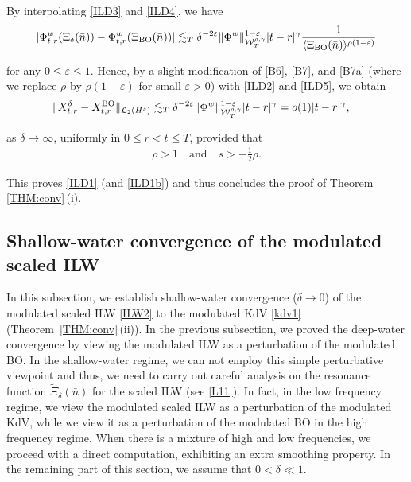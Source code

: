 \documentclass[letterpaper, 11pt,  reqno]{amsart}
\newcommand{\1}{\hspace{0.5mm}\text{I}\hspace{0.5mm}}
\newcommand{\noi}{\noindent}
\newcommand{\dl}{\delta}
\newcommand{\eps}{\varepsilon}
\newcommand{\g}{\gamma}
\newcommand{\wt}{\widetilde}
\newcommand{\les}{\lesssim}
\newcommand{\jb}[1]
{\langle #1 \rangle}
\newcommand{\cL}{\mathcal{L}}
\newcommand{\W}{\mathcal{W}}
\newcommand{\BO}{\text{\rm BO} }
\numberwithin{equation}{section}
\numberwithin{theorem}{section}
\begin{document}
\noi
By interpolating \eqref{ILD3} and \eqref{ILD4}, 
we have 
\begin{align}
|\Phi_{t,r}^w(\Xi_\dl (\bar n)) - \Phi_{t,r}^w(\Xi_\BO(\bar n) )|
\les_T \dl^{-2\eps} \|\Phi^w\|_{  \W^{\rho,\g}_T}^{1-\eps} 
|t - r|^\g
\frac 1{\jb{\Xi_\BO (\bar n)}^{\rho(1-\eps)}}
\label{ILD5}
\end{align}

\noi
for any $0 \le \eps \le 1$.
Hence, 
by a slight modification of \eqref{B6}, \eqref{B7}, and \eqref{B7a}
(where we replace $\rho$ by $\rho (1-\eps)$ for small $\eps > 0$)
with \eqref{ILD2} and \eqref{ILD5}, 
we obtain 
\begin{align*}
\| X_{t, r}^\dl - X^\BO_{t,r} \|_{\cL_2 (H^s)}
&\les_T \dl^{-2\eps}  
\|\Phi^w\|_{  \W^{\rho,\g}_T}^{1-\eps} 
|t - r|^\g
= o(1) |t - r|^\g, 
\end{align*}

\noi
as $\dl \to \infty$, 
uniformly in  $0 \le r < t \le T$, 
provided that 
\begin{align*}
\rho > 1\quad \text{and}\quad
s > - \frac 12 \rho.
\end{align*}

\noi
This proves \eqref{ILD1} (and \eqref{ILD1b})
and thus concludes the proof of Theorem \ref{THM:conv}\,(i).






\subsection{Shallow-water convergence of  the modulated scaled ILW}
\label{SUBSEC:BO4}



In this subsection,
we establish shallow-water 
convergence ($\dl \to 0$) of the modulated scaled ILW
\eqref{ILW2} to the modulated KdV \eqref{kdv1} 
(Theorem~\ref{THM:conv}\,(ii)).
In the previous subsection, 
we proved the deep-water convergence
 by viewing the modulated ILW
as a perturbation of the modulated BO.
In the shallow-water regime, 
we can not employ this simple perturbative viewpoint
and thus, we need to carry out careful analysis
on the resonance function $\wt \Xi_\dl(\bar n)$ 
for the scaled ILW (see  \eqref{L11}).
In fact, in the low frequency regime, 
we view the modulated scaled ILW
as a perturbation of the modulated KdV, 
while 
we view it 
as a perturbation of the modulated BO
in the high frequency regime.
When there is a mixture of high and low frequencies, 
we proceed with a direct computation, 
exhibiting an extra smoothing property.
In the remaining part of this section, 
we assume that  $0<\dl\ll1$.
\end{document}
